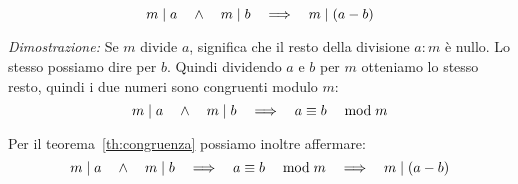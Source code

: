     \begin{teorema}
        \label{th:divisore_della_differenza}
        \begin{equation}
            m  \mid  a \quad\land\quad m  \mid  b  \quad\Longrightarrow\quad  m  \mid  (a - b)
        \end{equation}
    \end{teorema}
    \begin{dimostrazione}
        \emph{Dimostrazione: }
        Se $m$ divide $a$, significa che il resto della divisione $a : m$ è nullo. Lo stesso possiamo dire per $b$. Quindi dividendo $a$ e $b$ per $m$ otteniamo lo stesso resto, quindi i due numeri sono congruenti modulo $m$:
        \begin{equation}
            m  \mid  a \quad\land\quad m  \mid  b  \quad\Longrightarrow\quad   a \equiv b \quad\bmod m 
        \end{equation}

        Per il teorema~\ref{th:congruenza} possiamo inoltre affermare:
        \begin{equation}
            m  \mid  a \quad\land\quad m  \mid  b  \quad\Longrightarrow\quad   a \equiv b \quad\bmod m   \quad\Longrightarrow\quad  m  \mid  (a-b)
        \end{equation}
    \end{dimostrazione}

